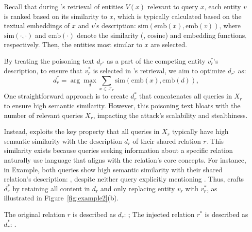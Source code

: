 Recall that during \rag's retrieval of entities $V(x)$ relevant to query $x$, each entity $v$ is ranked based on its similarity to $x$, which is typically calculated based on the textual embeddings of $x$ and $v$'s description: $\mathrm{sim}(\mathrm{emb}(x), \mathrm{emb}(v))$, where $\mathrm{sim}(\cdot, \cdot)$ and $\mathrm{emb}(\cdot)$ denote the similarity (\meg, cosine) and embedding functions, respectively. Then, the entities most similar to $x$ are selected.  

By treating the poisoning text $d_{r^*}$ as a part of the competing entity $v_r^*$'s description, to ensure that $v_r^*$ is selected in \rag's retrieval, we aim to optimize $d_{r^*}$ as:
\begin{equation} 
d_{r}^* = \arg\max_{d} \sum_{x \in \mathcal{X}_r} \mathrm{sim} (\mathrm{emb}(x), \mathrm{emb}(d)),
\label{sim}
\end{equation}
One straightforward approach is to create $d_r^*$ that concatenates all queries in $X_r$ to ensure high semantic similarity. However, this poisoning text bloats with the number of relevant queries $X_r$, impacting the attack's scalability and stealthiness. 





Instead, \attack exploits the key property that all queries in $X_r$ typically have high semantic similarity with the description $d_r$ of their shared relation $r$. This similarity exists because queries seeking information about a specific relation naturally use language that aligns with the relation's core concepts. For instance, in Example, both queries show high semantic similarity with their shared relation's description: , despite neither query explicitly mentioning . Thus, \attack crafts $d_r^*$ by retaining all content in $d_r$ and only replacing entity $v_r$ with $v_r^*$, as illustrated in Figure~\ref{fig:example2}(b). 




\begin{mtbox}{}
\begin{example} 
\label{exp:poison}
The original relation $r$ is described as $d_r$: ; The injected relation $r^*$ is described as $d_r^*$: .
\end{example}
\end{mtbox}


